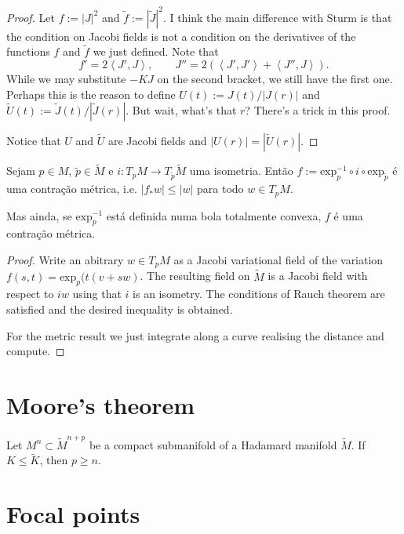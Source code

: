 \begin{proof}
Let $f:=|J|^2$ and $\tilde{f}:=|\tilde{J}|^2$. I think the main difference with
Sturm is that the condition on Jacobi fields is not a condition on the
derivatives of the functions $f$ and $\tilde{f}$ we just defined. Note that
$$
f'=2\left<J',J\right>,\qquad J''=2(\left<J',J'\right>+\left<J'',J\right>).
$$
While we may substitute $-KJ$ on the second bracket, we still have the first
one. Perhaps this is the reason to define $U(t):=J(t)/|J(r)|$ and
$\tilde{U}(t):=\tilde{J}(t)/|\tilde{J}(r)|$. But wait, what's that $r$? There's
a trick in this proof.

Notice that $U$ and $\tilde{U}$ are Jacobi fields and $|U(r)|=|\tilde{U}(r)|$.
\end{proof}

\begin{proposition}
\label{proposition-contraction}
Sejam $p \in M$, $\tilde{p} \in \tilde{M}$ e $i:T_pM \to T_{\tilde{p}}\tilde{M}$
uma isometria. Então $f:=\text{exp}^{-1}_p \circ i \circ
\text{exp}_{\tilde{p}}$ é uma contração métrica, i.e. $|f_*w|\leq |w|$
para todo $w \in T_pM$.

Mas ainda, se $\text{exp}_p^{-1}$ está definida numa bola totalmente
convexa, $f$ é uma contração métrica.
\end{proposition}

\begin{proof}
Write an abitrary $w\in T_p M$ as a Jacobi variational field of the variation 
$f(s,t)=\text{exp}_p(t(v+sw)$. The resulting field on $\tilde{M}$ is a
Jacobi field with respect to $iw$ using that $i$ is an isometry. The conditions
of Rauch theorem are satisfied and the desired inequality is obtained.

For the metric result we just integrate along a curve realising the distance and
compute.
\end{proof}

\section{Moore's theorem}
\label{section-Moore}

\begin{theorem}[Moore]
\label{theorem-Moore}
Let $M^n \subset \tilde{M}^{n+p}$ be a compact submanifold of a Hadamard
manifold $\tilde{M}$. If $K\leq \tilde{K}$, then $p\geq n$.
\end{theorem}

\section{Focal points}
\label{section-focal points}

